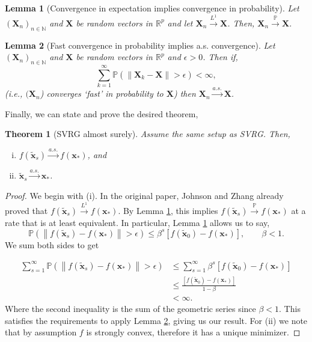 \documentclass[11pt] {article}
\newcommand{\norm}[1]{\left\lVert#1\right\rVert}
\newcommand{\Prob}{\mathbb{P}}
\newcommand{\X}{\pmb{X}}
\newcommand{\x}{\pmb{x}}
\newcommand{\convas}{\overset{a.s.}{\longrightarrow}}
\newcommand{\convp}{\overset{\Prob}{\longrightarrow}}
\newcommand{\naturals}{\mathbb{N}}
\newcommand{\reals}{\mathbb{R}}
\newtheorem{theorem}{Theorem}
\newtheorem{lemma}{Lemma}
\begin{document}
\begin{lemma}[Convergence in expectation implies convergence in probability]\label{comparingconvergence}
	Let $(\X_n)_{n \in \naturals}$ and $\X$ be random vectors in $\reals^p$ and let $\X_n \overset{L^1}{\longrightarrow} \X$. Then, $\X_n \convp \X$. 
\end{lemma}


\begin{lemma}[Fast convergence in probability implies a.s. convergence]\label{fastplemma}
	Let $(\X_n)_{n\in \naturals}$ and $\X$ be random vectors in $\reals^p$ and $\epsilon > 0$. Then if,
	\begin{equation} \label{fastp}
	\sum_{k=1}^{\infty} \mathbb{P}(\norm{\X_k-\X}> \epsilon) < \infty,
	\end{equation}
	(i.e., $(\X_n$) converges `fast' in probability to $\X$) then $\X_n\convas \X$.
\end{lemma}
%
Finally, we can state and prove the desired theorem,

\begin{theorem}[SVRG almost surely]\label{thm:SVRG-AS}
	Assume the same setup as SVRG. Then, 
	\begin{enumerate}[(i)]
		\item $f(\tilde{\x}_s) \convas f(\x_*)$, and 
		\item $\tilde{\x}_s \convas \x_*$.
	\end{enumerate}
\end{theorem}

\begin{proof}
	
	We begin with (i). In the original paper, Johnson and Zhang already proved that $f(\tilde{\x}_s) \overset{L^1}{\longrightarrow} f(\x_*)$. By Lemma \ref{comparingconvergence}, this implies $f(\tilde{\x}_s) \convp f(\x_*)$ at a rate that is at least equivalent. In particular, Lemma \ref{comparingconvergence} allows us to say,
	\begin{equation*}
	\mathbb{P}(\norm{f(\tilde{\x}_s) - f(\x_*)} > \epsilon) \leq \beta^s \left[f(\tilde{\x}_0) - f(\x_*)\right], \qquad \beta<1.
	\end{equation*}
%	
	We sum both sides to get
	
	\begin{align*}
	\sum_{s=1}^{\infty}	\mathbb{P}(\norm{f(\tilde{\x}_s) - f(\x_*)} > \epsilon) &\leq \sum_{s=1}^{\infty} \beta^s \left[f(\tilde{\x}_0) - f(\x_*)\right] \\
	&\leq \frac{\left[f(\tilde{\x}_0) - f(\x_*)\right]}{1- \beta}\\
	& < \infty.
	\end{align*}
	Where the second inequality is the sum of the geometric series since $\beta< 1$. This satisfies the requirements to apply Lemma \ref{fastplemma}, giving us our result.
	For (ii) we note that by assumption $f$ is strongly convex, therefore it has a unique minimizer.
\end{proof}
\end{document}
